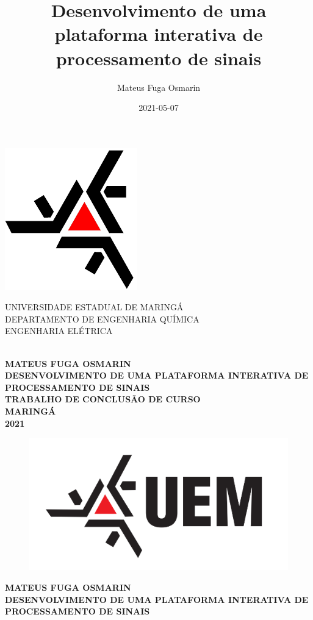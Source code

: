 \documentclass[12pt,a4paper]{report}
\title{Desenvolvimento de uma plataforma interativa de processamento de sinais}
\author{Mateus Fuga Osmarin}
\date{2021-05-07}
\begin{document}
\begin{minipage}{0.2\linewidth}
  \centering
  \includegraphics[scale=0.3]{images/uem}
\end{minipage}
\begin{minipage}{0.79\linewidth}
  {
    \centering
    \doublespacing
    \bf
     
    UNIVERSIDADE ESTADUAL DE MARINGÁ\\
    DEPARTAMENTO DE ENGENHARIA QUÍMICA\\
    ENGENHARIA ELÉTRICA\\
  }
\end{minipage}\\[4.54cm]

\center
{
  \bf
  \onehalfspacing
  MATEUS FUGA OSMARIN\\[4.54cm]

  DESENVOLVIMENTO DE UMA PLATAFORMA INTERATIVA DE PROCESSAMENTO DE SINAIS\\[4.54cm]


  TRABALHO DE CONCLUSÃO DE CURSO\\[4.54cm]


  {
    \bf
    MARINGÁ\\
    2021
  }
}
\thispagestyle{empty}
\clearpage


\begin{figure}[H]
\centering
\includegraphics[scale=0.5]{images/uem_escrito}\\[2.978cm]
\end{figure}
{
  \bf
  {
    MATEUS FUGA OSMARIN\\[2.978cm]

    DESENVOLVIMENTO DE UMA PLATAFORMA INTERATIVA DE PROCESSAMENTO DE SINAIS
  }\\[2.978cm]
}
\end{document}
